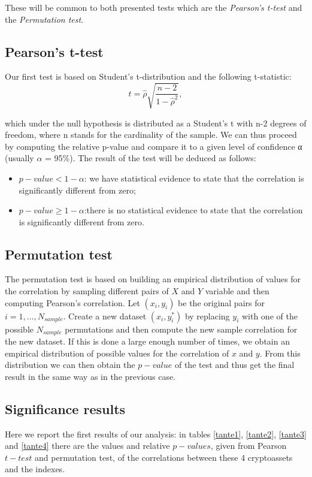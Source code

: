 \noindent
These will be common to both presented tests which are the \textit{Pearson's t-test} and the \textit{Permutation test}.

\subsection{Pearson's t-test}
Our first test is based on Student’s t-distribution and the following t-statistic:
\begin{equation}
    t= \hat{\rho} \sqrt{\frac{n-2}{1-\hat{\rho}^2}},
\end{equation}

which under the null hypothesis is distributed as a Student’s t with n-2 degrees of freedom, where n stands for the cardinality of the sample. We can thus proceed by computing the relative p-value and compare it to a given level of confidence α (usually $\alpha$ = 95\%). The result of the test will be deduced as follows:
\begin{itemize}
    \item $p-value < 1-\alpha$: we have statistical evidence to state that the correlation is significantly different from zero;
    \item $p-value \geq 1-\alpha$:there is no statistical evidence to state that the correlation is significantly different from zero.
\end{itemize}

\subsection{Permutation test}
The permutation test is based on building an empirical distribution of values for the correlation by sampling different pairs of $X$ and $Y$ variable and then computing Pearson’s correlation. Let $\left( x_i, y_i \right)$ be the original pairs for $i = 1,…,N_{sample}$. Create a new dataset $\left(x_i, y_i^*\right)$ by replacing $y_i$ with one of the possible $N_{sample}$ permutations and then compute the new sample correlation for the new dataset. If this is done a large enough number of times, we obtain an empirical distribution of possible values for the correlation of $x$ and $y$.
From this distribution we can then obtain the $p-value$ of the test and thus get the final result in the same way as in the previous case.

\subsection{Significance results}
Here we report the first results of our analysis: in tables \ref{tante1}, \ref{tante2}, \ref{tante3} and \ref{tante4} there are the values and relative $p-values$, given from Pearson $t-test$ and permutation test, of the correlations between these 4 cryptoassets and the indexes.

